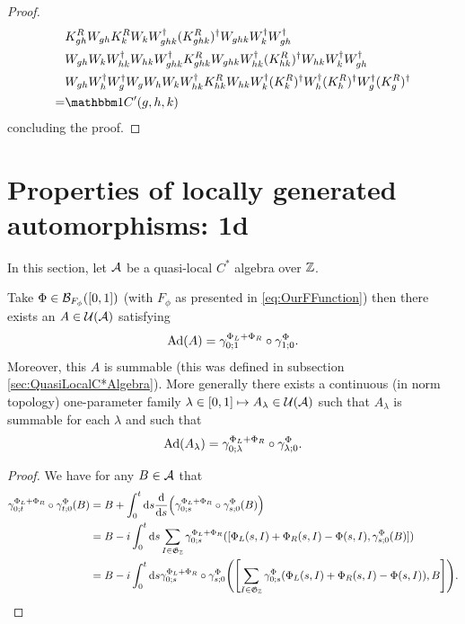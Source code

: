 \documentclass[11pt,a4paper,twoside]{article}
\numberwithin{equation}{section}
\begin{document}
{\begin{proof}
\begin{align}
			\nonumber
			&K_{gh}^RW_{gh}K_k^RW_kW_{ghk}^\dagger(K_{ghk}^R)^\dagger W_{ghk}W_k^\dagger W_{gh}^\dagger  \\
			\nonumber
			&W_{gh}W_kW_{hk}^\dagger W_{hk}W_{ghk}^\dagger K^R_{ghk} W_{ghk}W_{hk}^\dagger(K^R_{hk})^{\dagger} W_{hk}W_k^\dagger W_{gh}^\dagger\\
			\nonumber
			&W_{gh}W_h^\dagger W_g^\dagger W_gW_h W_kW_{hk}^\dagger K_{hk}^RW_{hk}W_k^\dagger(K^R_k)^\dagger W_h^\dagger (K^R_h)^\dagger W_g^\dagger (K^R_g)^\dagger\\
			=&\id C'(g,h,k)
		\end{align}
		concluding the proof.
	\end{proof}
	\section{Properties of locally generated automorphisms: 1d}\label{sec:properties-of-locally-generated-automorphisms-1d}
	In this section, let $\AA$ be a quasi-local $C^*$ algebra over $\ZZ$.
	\begin{lemma}\label{lem:PropertiesLocallyGeneratedAutomorphisms1d}
		Take $\Phi\in\BB_{F_\phi}([0,1])$ (with $F_\phi$ as presented in \eqref{eq:OurFFunction}) then there exists an $A\in\UU(\AA)$ satisfying
		\begin{equation}
			\Ad{A}=\gamma^{\Phi_L+\Phi_R}_{0;1}\circ\gamma^\Phi_{1;0}.
		\end{equation}
		Moreover, this $A$ is summable (this was defined in subsection \ref{sec:QuasiLocalC*Algebra}). More generally there exists a continuous (in norm topology) one-parameter family $\lambda\in[0,1]\mapsto A_\lambda\in\UU(\AA)$ such that $A_\lambda$ is summable for each $\lambda$ and such that
		\begin{equation}
			\Ad{A_\lambda}=\gamma^{\Phi_L+\Phi_R}_{0;\lambda}\circ\gamma^\Phi_{\lambda;0}.
		\end{equation}
	\end{lemma}
	\begin{proof}
		We have for any $B\in\AA$ that
		\begin{align}
			\gamma^{\Phi_L+\Phi_R}_{0;t}\circ\gamma^\Phi_{t;0}(B)&=B+\int_{0}^{t}\d s\frac{\d}{\d s}\left(\gamma^{\Phi_L+\Phi_R}_{0;s}\circ\gamma^\Phi_{s;0}(B)\right)\\
			&=B-i\int_{0}^{t}\d s\sum_{I\in\mathfrak{G}_\ZZ}\gamma^{\Phi_L+\Phi_R}_{0;s}([\Phi_L(s,I)+\Phi_R(s,I)-\Phi(s,I),\gamma^{\Phi}_{s;0}(B)])\\
			\label{eq:EquationShowingBounded_H}
			&=B-i\int_{0}^{t}\d s\gamma^{\Phi_L+\Phi_R}_{0;s}\circ\gamma^{\Phi}_{s;0}\left(\left[\sum_{I\in\mathfrak{G}_\ZZ}\gamma^{\Phi}_{0;s}(\Phi_L(s,I)+\Phi_R(s,I)-\Phi(s,I)),B\right]\right).

\end{align}
\end{proof}}
\end{document}
